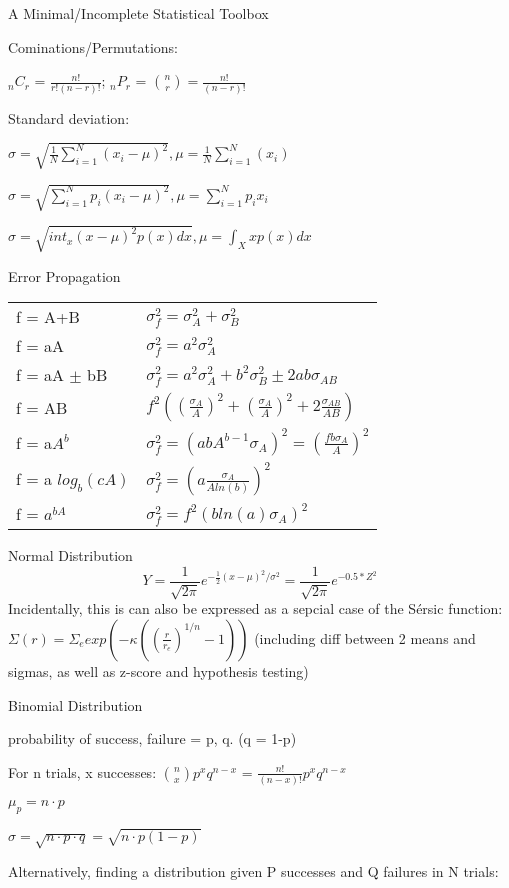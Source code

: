 \documentclass{slides}
\begin{document}
A Minimal/Incomplete Statistical Toolbox

Cominations/Permutations:

$_nC_r$ = $\frac{n!}{r!(n-r)!}$; $_nP_r$ = $\binom{n}{r} = \frac{n!}{(n-r)!}$


Standard deviation:

$\sigma = \sqrt{\frac{1}{N}\sum_{i=1}^{N} (x_i - \mu)^2}, \mu = \frac{1}{N}\sum_{i=1}^{N}(x_i)$

$\sigma = \sqrt{\sum_{i=1}^{N} p_i (x_i -\mu)^2}, \mu = \sum_{i=1}^{N} p_i x_i$

$\sigma = \sqrt{int_{x} (x - \mu)^2p(x)dx}, \mu = \int_{X} x p(x)dx$

\newpage
Error Propagation

\begin{tabular}{l l}
 f = A+B & $\sigma^2_f = \sigma^2_A + \sigma^2_B$ \\
 f = aA & $\sigma^2_f = a^2\sigma^2_A$ \\
 f = aA $\pm$ bB & $\sigma_f^2 = a^2\sigma_A^2 + b^2\sigma_B^2 \pm 2ab\sigma_{AB}$ \\
 f = AB & $f^2 ((\frac{\sigma_A}{A})^2 + (\frac{\sigma_A}{A})^2 + 2\frac{\sigma_{AB}}{AB})$ \\ 
 f = a$A^b$ & $\sigma_f^2 = (abA^{b-1}\sigma_A)^2 = (\frac{fb\sigma_A}{A})^2$ \\
 f = a $log_b(cA)$ & $\sigma_f^2 = (a\frac{\sigma_A}{A ln(b)})^2$ \\
 f = $a^{bA}$ & $\sigma^2_f = f^2(b ln(a)\sigma_A)^2$ \\
\end{tabular}

\newpage
Normal Distribution
\[
Y = \frac{1}{\sqrt{2\pi}} e^{-\frac{1}{2}(x-\mu)^2/\sigma^2} = \frac{1}{\sqrt{2\pi}} e^{-0.5*Z^2} 
\]
Incidentally, this is can also be expressed as a sepcial case of the S\'ersic function: $\Sigma(r) = \Sigma_e exp(-\kappa((\frac{r}{r_e})^{1/n}-1))$
(including diff between 2 means and sigmas, as well as z-score and hypothesis testing)

\newpage
Binomial Distribution

probability of success, failure = p, q. (q = 1-p)

For n trials, x successes: $\binom{n}{x}p^x q^{n-x}$ = $\frac{n!}{(n-x)!}p^x q^{n-x}$

$\mu_p = n \cdot p$

$\sigma = \sqrt{n \cdot p \cdot q} = \sqrt{n \cdot p (1-p)} $

Alternatively, finding a distribution given P successes and Q failures in N trials:
\end{document}
